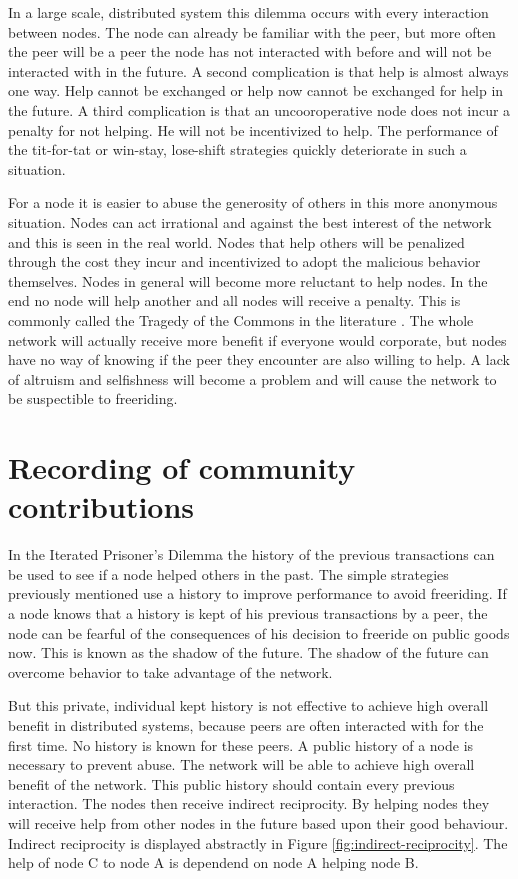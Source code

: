 In a large scale, distributed system this dilemma occurs with every interaction between nodes.
The node can already be familiar with the peer,
but more often the peer will be a peer the node has not interacted with before
and will not be interacted with in the future.
A second complication is that help is almost always one way.
Help cannot be exchanged or help now cannot be exchanged for help in the future\cite{Lai-Incentives}.
A third complication is that an uncooroperative node does not incur a penalty for not helping.
He will not be incentivized to help.
The performance of the tit-for-tat or win-stay, lose-shift strategies
quickly deteriorate in such a situation.

For a node it is easier to abuse the generosity of others in this more anonymous situation.
Nodes can act irrational and against the best interest of the network
and this is seen in the real world\cite{Adar-Freeriding}.
Nodes that help others will be penalized through the cost they incur
and incentivized to adopt the malicious behavior themselves.
Nodes in general will become more reluctant to help nodes\cite{Nowak-PrisonerDilemma}.
In the end no node will help another and all nodes will receive a penalty.
This is commonly called the Tragedy of the Commons in the literature \cite{Hardin-Tragedy}.
The whole network will actually receive more benefit if everyone would corporate,
but nodes have no way of knowing if the peer they encounter are also willing to help.
A lack of altruism and selfishness will become a problem 
and will cause the network to be suspectible to freeriding.

\section{Recording of community contributions}
In the Iterated Prisoner's Dilemma the history of the previous transactions can be used 
to see if a node helped others in the past.
The simple strategies previously mentioned use a history to improve performance
to avoid freeriding.
If a node knows that a history is kept of his previous transactions by a peer,
the node can be fearful of the consequences of his decision to freeride on public goods now.
This is known as the shadow of the future\cite{bo-shadow}.
The shadow of the future can overcome behavior to take advantage of the network.

But this private, individual kept history is not effective
to achieve high overall benefit in distributed systems\cite{Lai-Incentives},
because peers are often interacted with for the first time.
No history is known for these peers.
A public history of a node is necessary to prevent abuse.
The network will be able to achieve high overall benefit of the network\cite{Lai-Incentives}.
This public history should contain every previous interaction.
The nodes then receive indirect reciprocity\cite{Nowak-Cooperation}.
By helping nodes they will receive help from other nodes in the future based upon their good behaviour.
Indirect reciprocity is displayed abstractly in Figure \ref{fig:indirect-reciprocity}.
The help of node C to node A is dependend on node A helping node B.

